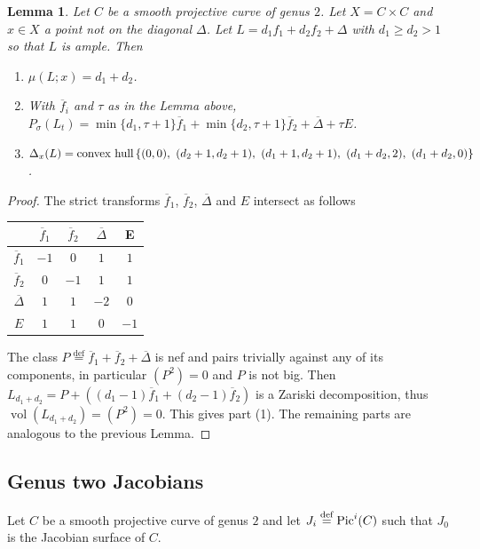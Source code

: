 \documentclass[12pt]{amsart}
\newtheorem{lemma}{Lemma}[section]
\theoremstyle{definition}
\renewcommand{\geq}{\geqslant}
\DeclareMathOperator{\vol}{vol}
\newcommand{\deq}{\ensuremath{\stackrel{\textrm{def}}{=}}}
\newcommand{\inob}[2]{\ensuremath{{\Delta}_{#1}(#2)}}
\newcommand{\?}{ \circled{{\large\bf ?}}}
\begin{document}
\begin{lemma}
	Let $C$ be a smooth projective curve of genus $2$. 
	Let $X=C\times C$ and $x\in X$ a point not on the diagonal $\Delta$. Let $L=d_1f_1+d_2f_2+\Delta$ with $d_1\geq d_2>1$ so that $L$ is ample. Then
	\begin{enumerate}
		\item $\mu(L;x)=d_1+d_2$.
		\smallskip
		
		\item With $\overline f_i$ and $\tau$ as in the Lemma above, $P_{\sigma}(L_t)=\min\{d_1,\tau+1\}\overline f_1+\min\{d_2,\tau+1\}\overline f_2+\overline\Delta+\tau E$.
		\smallskip
		
		\item $\inob{x}{L}=\textup{convex hull}\left\{(0,0),\ (d_2+1,d_2+1),\  (d_1+1,d_2+1),\ (d_1+d_2,2),\ (d_1+d_2,0)\right\}$.
	\end{enumerate}
\end{lemma}
\begin{proof}
	The strict transforms $\overline f_1$, $\overline f_2$, $\overline\Delta$ and $E$ intersect as follows
	
	\begin{center} 	
		\begin{tabular}{|c|c|c|c|c|}
			\hline & $\overline f_1$&$\overline f_2$&$\overline\Delta$&E\\
			\hline $\overline f_1$&$-1$ &$0$ &$1$ &$1$ \\
			\hline $\overline f_2$& $0$&$-1$ &$1$ &$1$ \\
			\hline $\overline\Delta$& $1$&$1$ &$-2$ &$0$ \\
			\hline $E$&$1$ &$1$ &$0$ &$-1$ \\
			\hline
		\end{tabular}
	\end{center} 
	The class $P\deq \overline f_1+\overline f_2+\overline\Delta$ is nef and pairs trivially against any of its components, in particular $(P^2)=0$ and $P$ is not big. Then $L_{d_1+d_2}=P+((d_1-1)\overline f_1+(d_2-1)\overline f_2)$ is a Zariski decomposition, thus $\vol(L_{d_1+d_2})=(P^2)=0$. This gives part (1).
	The remaining parts are analogous to the previous Lemma.
\end{proof}


\subsection{Genus two Jacobians} 
Let $C$ be a smooth projective curve of genus $2$ and let $J_i\deq\textup{Pic}^i(C)$ such that $J_0$ is the Jacobian surface of $C$. 
\end{document}
